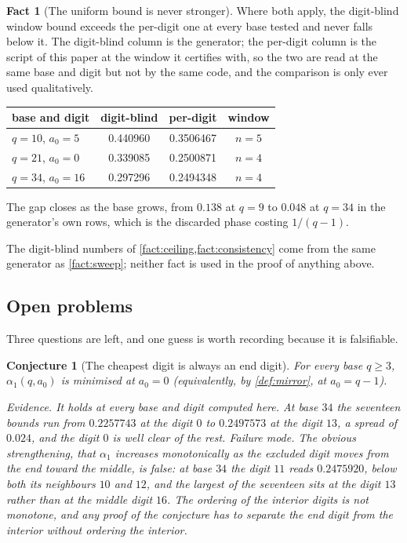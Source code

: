 \documentclass[11pt]{amsart}
\newtheorem{conjecture}[theorem]{Conjecture}
\theoremstyle{definition}
\newtheorem{fact}[theorem]{Fact}
\theoremstyle{remark}
\begin{document}
\begin{fact}[The uniform bound is never stronger]
\label{fact:consistency}
Where both apply, the digit-blind window bound exceeds the per-digit one at every base tested and never falls below it. The digit-blind column is the generator; the per-digit column is the script of this paper at the window it certifies with, so the two are read at the same base and digit but not by the same code, and the comparison is only ever used qualitatively.
\begin{center}
\begin{tabular}{lccc}
\toprule
base and digit & digit-blind & per-digit & window \\
\midrule
$q = 10$, $a_{0} = 5$  & 0.440960 & 0.3506467 & $n = 5$ \\
$q = 21$, $a_{0} = 0$  & 0.339085 & 0.2500871 & $n = 4$ \\
$q = 34$, $a_{0} = 16$ & 0.297296 & 0.2494348 & $n = 4$ \\
\bottomrule
\end{tabular}
\end{center}
The gap closes as the base grows, from $0.138$ at $q = 9$ to $0.048$ at $q = 34$ in the generator's own rows, which is the discarded phase costing $1/(q-1)$.
\end{fact}

The digit-blind numbers of \cref{fact:ceiling,fact:consistency} come from the same generator as \cref{fact:sweep}; neither fact is used in the proof of anything above.

\subsection{Open problems}
\label{sub:open}

Three questions are left, and one guess is worth recording because it is falsifiable.

\begin{conjecture}[The cheapest digit is always an end digit]
\label{conj:zero}
For every base $q \ge 3$, $\alpha_{1}(q, a_{0})$ is minimised at $a_{0} = 0$ (equivalently, by \cref{def:mirror}, at $a_{0} = q-1$).

\emph{Evidence.} It holds at every base and digit computed here. At base $34$ the seventeen bounds run from $0.2257743$ at the digit $0$ to $0.2497573$ at the digit $13$, a spread of $0.024$, and the digit $0$ is well clear of the rest. \emph{Failure mode.} The obvious strengthening, that $\alpha_{1}$ increases monotonically as the excluded digit moves from the end toward the middle, is false: at base $34$ the digit $11$ reads $0.2475920$, below both its neighbours $10$ and $12$, and the largest of the seventeen sits at the digit $13$ rather than at the middle digit $16$. The ordering of the interior digits is not monotone, and any proof of the conjecture has to separate the end digit from the interior without ordering the interior.
\end{conjecture}
\end{document}
